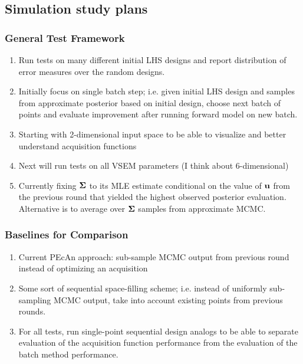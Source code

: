\documentclass[12pt]{article}
\begin{document}
\begin{enumerate}
\subsection{Simulation study plans}

\subsubsection{General Test Framework}
\begin{enumerate}
\item Run tests on many different initial LHS designs and report distribution of error measures over the random designs. 
\item Initially focus on single batch step; i.e. given initial LHS design and samples from approximate posterior based on initial design, 
choose next batch of points and evaluate improvement after running forward model on new batch. 
\item Starting with 2-dimensional input space to be able to visualize and better understand acquisition functions
\item Next will run tests on all VSEM parameters (I think about 6-dimensional) 
\item Currently fixing $\boldsymbol{\Sigma}$ to its MLE estimate conditional on the value of $\mathbf{u}$ from the previous round that yielded the 
highest observed posterior evaluation. Alternative is to average over $\boldsymbol{\Sigma}$ samples from approximate MCMC. 
\end{enumerate}

\subsubsection{Baselines for Comparison}
\begin{enumerate}
	\item Current PEcAn approach: sub-sample MCMC output from previous round instead of optimizing an acquisition
	\item Some sort of sequential space-filling scheme; i.e. instead of uniformly sub-sampling MCMC output, 
	        take into account existing points from previous rounds.  
	\item For all tests, run single-point sequential design analogs to be able to separate evaluation of the acquisition function performance
	         from the evaluation of the batch method performance. 
\end{enumerate}


\end{enumerate}
\end{document}
